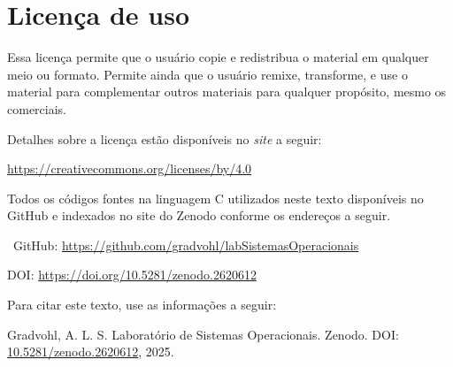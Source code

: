\chapter*{Licença de uso}\label{chp:licenca}
\doclicenseThis

Essa licença permite que o usuário copie e redistribua o material em qualquer meio ou formato. Permite ainda que o usuário remixe, transforme, e use o material para complementar outros materiais para qualquer propósito, mesmo os comerciais.

 Detalhes sobre a licença estão disponíveis no \textit{site} a seguir:
 \begin{center}
    \url{https://creativecommons.org/licenses/by/4.0}     
 \end{center}

Todos os códigos fontes na linguagem C utilizados neste texto disponíveis no GitHub e indexados no site do Zenodo conforme os endereços a seguir.

\faGithub\ GitHub: \url{https://github.com/gradvohl/labSistemasOperacionais}

DOI: \url{https://doi.org/10.5281/zenodo.2620612}

Para citar este texto, use as informações a seguir:

\noindent
{\sc Gradvohl, A. L. S.} Laboratório de Sistemas Operacionais. Zenodo. DOI: \href{http://doi.org/10.5281/zenodo.2620612}{10.5281/zenodo.2620612}, 2025.
